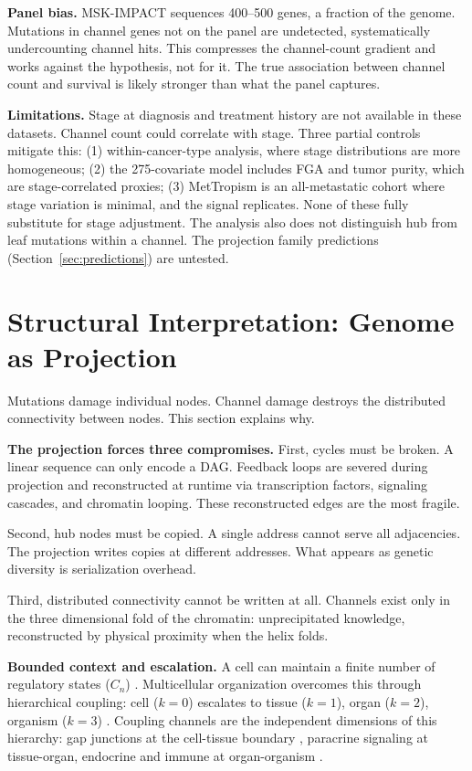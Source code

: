 \documentclass[11pt]{article}
\begin{document}
\textbf{Panel bias.} MSK-IMPACT sequences 400--500 genes, a
fraction of the genome. Mutations in channel genes not on the panel
are undetected, systematically undercounting channel hits. This
compresses the channel-count gradient and works against the
hypothesis, not for it. The true association between channel count
and survival is likely stronger than what the panel captures.

\textbf{Limitations.} Stage at diagnosis and treatment history are
not available in these datasets. Channel count could correlate with
stage. Three partial controls mitigate this: (1) within-cancer-type
analysis, where stage distributions are more homogeneous;
(2) the 275-covariate model includes FGA and tumor purity, which
are stage-correlated proxies; (3) MetTropism is an all-metastatic
cohort where stage variation is minimal, and the signal replicates.
None of these fully substitute for stage adjustment. The analysis
also does not distinguish hub from leaf mutations within a channel.
The projection family predictions (Section~\ref{sec:predictions})
are untested.

\section{Structural Interpretation: Genome as Projection}
\label{sec:framework}

Mutations damage individual nodes. Channel damage destroys the
distributed connectivity between nodes. This section explains why.

\textbf{The projection forces three compromises.}
First, cycles must be broken. A linear sequence can only encode a
DAG. Feedback loops are severed during projection and reconstructed
at runtime via transcription factors, signaling cascades, and
chromatin looping. These reconstructed edges are the most fragile.

Second, hub nodes must be copied. A single address cannot serve all
adjacencies. The projection writes copies at different addresses.
What appears as genetic diversity is serialization overhead.

Third, distributed connectivity cannot be written at all. Channels
exist only in the three dimensional fold of the chromatin:
unprecipitated knowledge, reconstructed by physical proximity when
the helix folds.

\textbf{Bounded context and escalation.}
A cell can maintain a finite number of regulatory states ($C_n$)
\cite{Cowan2001}. Multicellular organization overcomes this through
hierarchical coupling: cell ($k\!=\!0$) escalates to tissue
($k\!=\!1$), organ ($k\!=\!2$), organism ($k\!=\!3$)
\cite{McCarthy2026c}. Coupling channels are the independent
dimensions of this hierarchy: gap junctions at the cell-tissue
boundary \cite{Aasen2016}, paracrine signaling at tissue-organ,
endocrine and immune at organ-organism \cite{Hanahan2011}.
\end{document}
